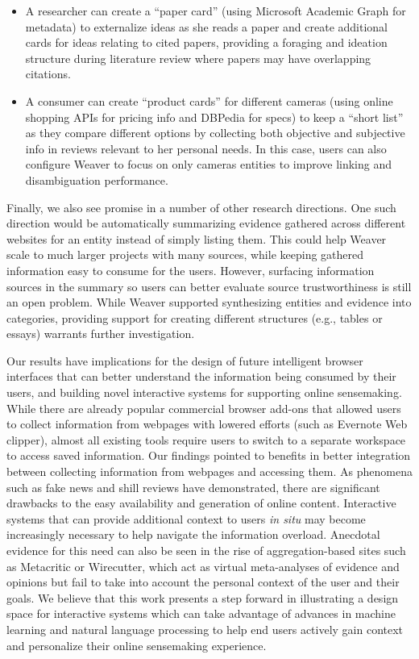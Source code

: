 \begin{itemize}
    \item A researcher can create a ``paper card'' (using Microsoft Academic Graph for metadata) to externalize ideas as she reads a paper and create additional cards for ideas relating to cited papers, providing a foraging and ideation structure during literature review where papers may have overlapping citations. 

    \item A consumer can create ``product cards'' for different cameras (using online shopping APIs for pricing info and DBPedia for specs) to keep a ``short list'' as they compare different options by collecting both objective and subjective info in reviews relevant to her personal needs. In this case, users can also configure Weaver to focus on only cameras entities to improve linking and disambiguation performance.
\end{itemize}



Finally, we also see promise in a number of other research directions. One such direction would be automatically summarizing evidence gathered across different websites for an entity instead of simply listing them. This could help Weaver scale to much larger projects with many sources, while keeping gathered information easy to consume for the users. However, surfacing information sources in the summary so users can better evaluate source trustworthiness is still an open problem. While Weaver supported synthesizing entities and evidence into categories, providing support for creating different structures (e.g., tables or essays) warrants further investigation.

Our results have implications for the design of future intelligent browser interfaces that can better understand the information being consumed by their users, and building novel interactive systems for supporting online sensemaking. While there are already popular commercial browser add-ons that allowed users to collect information from webpages with lowered efforts (such as Evernote Web clipper), almost all existing tools require users to switch to a separate workspace to access saved information. Our findings pointed to benefits in better integration between collecting information from webpages and accessing them.
As phenomena such as fake news and shill reviews have demonstrated, there are significant drawbacks to the easy availability and generation of online content. Interactive systems that can provide additional context to users \emph{in situ} may become increasingly necessary to help navigate the information overload. Anecdotal evidence for this need can also be seen in the rise of aggregation-based sites such as Metacritic or Wirecutter, which act as virtual meta-analyses of evidence and opinions but fail to take into account the personal context of the user and their goals. We believe that this work presents a step forward in illustrating a design space for interactive systems which can take advantage of advances in machine learning and natural language processing to help end users actively gain context and personalize their online sensemaking experience.


